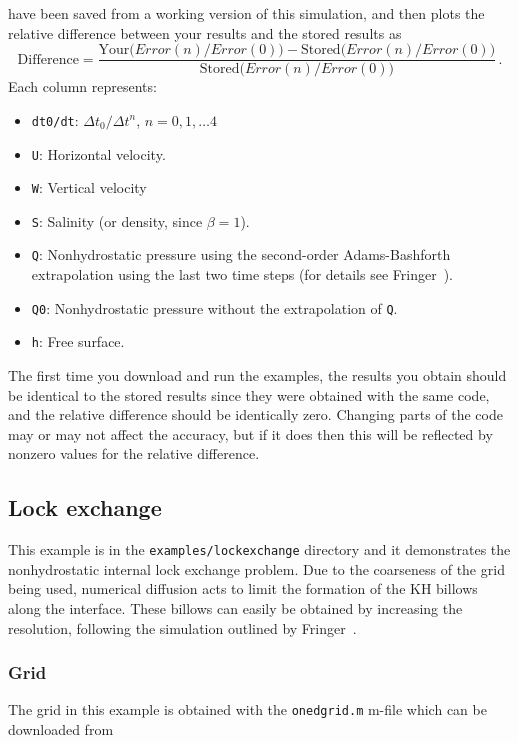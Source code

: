 have been saved from a working version of this simulation, and then plots the relative
difference between your results and the stored results as
\[
\mbox{Difference} = \frac{\mbox{Your($Error(n)/Error(0)$)} - \mbox{Stored($Error(n)/Error(0)$)}}
{\mbox{Stored($Error(n)/Error(0)$)}}\,.
\]
Each column represents:
\begin{itemize}
\item \verb+dt0/dt+: $\Delta t_0/\Delta t^n$, $n=0,1,\dots 4$
\item \verb+U+: Horizontal velocity.
\item \verb+W+: Vertical velocity
\item \verb+S+: Salinity (or density, since $\beta=1$).
\item \verb+Q+: Nonhydrostatic pressure using the second-order Adams-Bashforth extrapolation
using the last two time steps (for details see Fringer\etal~\cite{FRINGER[2005]}).
\item \verb+Q0+: Nonhydrostatic pressure without the extrapolation of \verb+Q+.
\item \verb+h+: Free surface.
\end{itemize}
The first time you download and run the examples, the results
you obtain should be identical to the stored results since they were obtained with the
same code, and the relative difference should be identically zero.  Changing parts of the
code may or may not affect the accuracy, but if it does then this will be reflected by
nonzero values for the relative difference.

\subsection{Lock exchange} \label{sec:lockexchange}

This example is in the \verb+examples/lockexchange+ directory and it 
demonstrates the nonhydrostatic internal lock exchange problem.  Due to the
coarseness of the grid being used, numerical diffusion acts to limit the formation of
the KH billows along the interface.  These billows can easily be obtained by increasing
the resolution, following the simulation outlined by Fringer\etal~\cite{FRINGER[2005]}.

\subsubsection{Grid}

The grid in this example is obtained with the 
\verb+onedgrid.m+ m-file which can be downloaded from 

